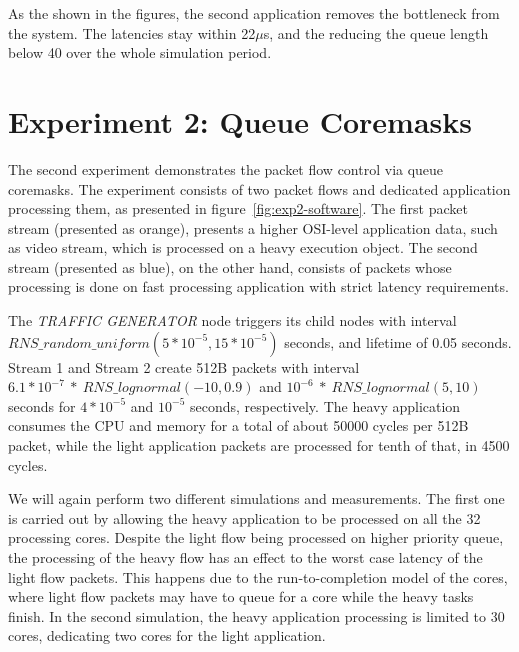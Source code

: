 As the shown in the figures, the second application removes the bottleneck from the system. The latencies stay within 22$\mu$s, and the reducing the queue length below 40 over the whole simulation period.

\section{Experiment 2: Queue Coremasks}

The second experiment demonstrates the packet flow control via queue coremasks. The experiment consists of two packet flows and dedicated application processing them, as presented in figure~\ref{fig:exp2-software}. The first packet stream (presented as orange), presents a higher OSI-level application data, such as video stream, which is processed on a heavy execution object. The second stream (presented as blue), on the other hand, consists of packets whose processing is done on fast processing application with strict latency requirements.

The \emph{TRAFFIC GENERATOR} node triggers its child nodes with interval $RNS\_random\_uniform(5*10^{-5}, 15*10^{-5})$ seconds, and lifetime of 0.05 seconds. Stream 1 and Stream 2 create 512B packets with interval $6.1*10^{-7}~*~RNS\_lognormal(-10, 0.9)$ and $10^{-6}~*~RNS\_lognormal(5, 10)$ seconds for $4*10^{-5}$ and $10^{-5}$ seconds, respectively. The heavy application consumes the CPU and memory for a total of about 50000 cycles per 512B packet, while the light application packets are processed for tenth of that, in 4500 cycles.

We will again perform two different simulations and measurements. The first one is carried out by allowing the heavy application to be processed on all the 32 processing cores. Despite the light flow being processed on higher priority queue, the processing of the heavy flow has an effect to the worst case latency of the light flow packets. This happens due to the run-to-completion model of the cores, where light flow packets may have to queue for a core while the heavy tasks finish. In the second simulation, the heavy application processing is limited to 30 cores, dedicating two cores for the light application.

